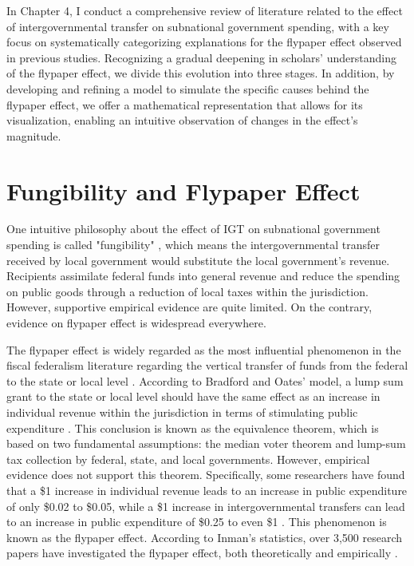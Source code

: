 In Chapter 4, I conduct a comprehensive review of literature related to the effect of intergovernmental transfer on subnational government spending, with a key focus on systematically categorizing explanations for the flypaper effect observed in previous studies. Recognizing a gradual deepening in scholars' understanding of the flypaper effect, we divide this evolution into three stages. In addition, by developing and refining a model to simulate the specific causes behind the flypaper effect, we offer a mathematical representation that allows for its visualization, enabling an intuitive observation of changes in the effect's magnitude.

\section{Fungibility and Flypaper Effect}

One intuitive philosophy about the effect of IGT on subnational government spending is called "fungibility" \parencite{pack1993foreign}, which means the intergovernmental transfer received by local government would substitute the local government's revenue. Recipients assimilate federal funds into general revenue and reduce the spending on public goods through a reduction of local taxes within the jurisdiction. However, supportive empirical evidence are quite limited. On the contrary, evidence on flypaper effect is widespread everywhere.

The flypaper effect is widely regarded as the most influential phenomenon in the fiscal federalism literature regarding the vertical transfer of funds from the federal to the state or local level \parencite{hines1995anomalies,gamkhar2007impact}. According to Bradford and Oates' model, a lump sum grant to the state or local level should have the same effect as an increase in individual revenue within the jurisdiction in terms of stimulating public expenditure \parencite{bradford1971analysis}. This conclusion is known as the equivalence theorem, which is based on two fundamental assumptions: the median voter theorem and lump-sum tax collection by federal, state, and local governments. However, empirical evidence does not support this theorem. Specifically, some researchers have found that a \$1 increase in individual revenue leads to an increase in public expenditure of only \$0.02 to \$0.05, while a \$1 increase in intergovernmental transfers can lead to an increase in public expenditure of \$0.25 to even \$1 \parencite{bailey1998flypaper,dollery1996empirical,gamkhar2007impact}. This phenomenon is known as the flypaper effect. According to Inman's statistics, over 3,500 research papers have investigated the flypaper effect, both theoretically and empirically \parencite{inman2008flypaper}.

